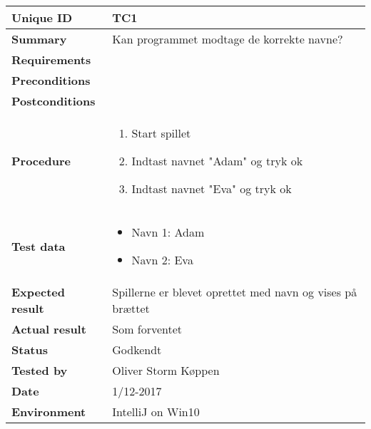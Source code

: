 \begin{table}[H]
    \begin{center}
        \begin{tabular}{|l|p{8cm}|}
            \hline
            \textbf{Unique ID} & TC1 \\
            \hline
            \textbf{Summary} & Kan programmet modtage de korrekte navne? \\
            \hline
            \textbf{Requirements} & \\
            \hline
            \textbf{Preconditions} & \\
            \hline
            \textbf{Postconditions} & \\
            \hline
            \textbf{Procedure} & \begin{enumerate}
                \setlength\itemsep{0ex}
                \item Start spillet
                \item Indtast navnet "Adam" og tryk ok
                \item Indtast navnet "Eva" og tryk ok
            \end{enumerate} \\
            \hline
            \textbf{Test data} & \begin{itemize}
                \setlength\itemsep{0ex}
                \item Navn 1: Adam
                \item Navn 2: Eva
            \end{itemize} \\
            \hline
            \textbf{Expected result} & Spillerne er blevet oprettet med navn og vises på brættet \\
            \hline
            \textbf{Actual result} & Som forventet \\
            \hline
            \textbf{Status} & Godkendt \\
            \hline
            \textbf{Tested by} & Oliver Storm Køppen \\
            \hline
            \textbf{Date} & 1/12-2017 \\
            \hline
            \textbf{Environment} & IntelliJ on Win10 \\
            \hline
        \end{tabular}
    \end{center}
\end{table}

